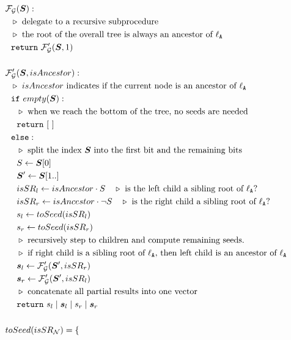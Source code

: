 \begin{figure}
  \begin{align*}
    &\func_\gadget(\vec S):\\
    &~~\codecomment{delegate to a recursive subprocedure}\\
    &~~\codecomment{the root of the overall tree is always an ancestor
    of \aid}\\
    &~~\creturn~\func_\gadget'(\vec S, 1)\\
    \\
    &\func_\gadget'(\vec S, isAncestor):\\
    &~~\codecomment{$isAncestor$ indicates if the current node is an ancestor of \aid}\\
    &~~\cif~empty(\vec S):\\
    &~~~~\codecomment{when we reach the bottom of the tree, no
    seeds are needed}\\
    &~~~~\creturn~[~]\\
    &~~\celse:\\
    &~~~~\codecomment{split the index $\vec S$ into the first bit and
    the remaining bits}\\
    &~~~~S \gets \vec S[0]\\
    &~~~~\vec S' \gets \vec S[1..]\\
    &~~~~isSR_l \gets isAncestor\cdot S \quad\codecomment{is the left
    child a sibling root of \aid?}\\
    &~~~~isSR_r \gets isAncestor\cdot \neg S \quad \codecomment{is the
    right child a sibling root of \aid?}\\
    &~~~~s_l \gets toSeed(isSR_l)\\
    &~~~~s_r \gets toSeed(isSR_r)\\
    &~~~~\codecomment{recursively step to children and compute remaining seeds}.\\
    &~~~~\codecomment{if right child is a sibling root of \aid,
    then left child is an ancestor of \aid}\\
    &~~~~\vec s_l \gets \func_\gadget'(\vec S', isSR_r)\\
    &~~~~\vec s_r \gets \func_\gadget'(\vec S', isSR_l)\\
    &~~~~\codecomment{concatenate all partial results into one
    vector}\\
    &~~~~\creturn~s_l \mid \vec s_l\mid  s_r\mid  \vec s_r\\
    \\
    &toSeed(isSR_\node) = 
    \begin{cases}

\end{cases}
\end{align*}
\end{figure}
